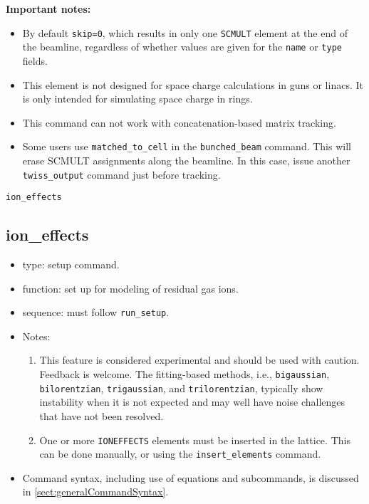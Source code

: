 \documentclass[11pt]{article}
\begin{document}
{\bf Important notes:}
\begin{itemize}
\item By default \verb|skip=0|, which results in only one \verb|SCMULT| element at the end of the beamline,
  regardless of whether values are given for the \verb|name| or \verb|type| fields.
\item This element is not designed for space charge calculations in guns or linacs.  It is only intended for
  simulating space charge in rings. 
\item This command can not work with concatenation-based matrix tracking.  
\item Some users use \verb|matched_to_cell| in the \verb|bunched_beam| command. 
  This will erase SCMULT assignments along the beamline. In this case, issue another \verb|twiss_output|
  command just before tracking.
\end{itemize}

\newpage
\begin{center}{\Large\verb|ion_effects|}\end{center}
\subsection{ion\_effects \label{subsec:ioneffects}}

\begin{itemize}
\item type: setup command.
\item function: set up for modeling of residual gas ions.
\item sequence: must follow \verb|run_setup|.
\item Notes:
  \begin{enumerate}
  \item This feature is considered experimental and should be used with caution.
    Feedback is welcome. The fitting-based methods, i.e., \verb|bigaussian|, \verb|bilorentzian|, 
    \verb|trigaussian|, and \verb|trilorentzian|, typically show instability when it is not expected and
    may well have noise challenges that have not been resolved.
  \item One or more \verb|IONEFFECTS| elements must be inserted in the lattice. This can be
    done manually, or using the \verb|insert_elements| command.
  \end{enumerate}
\item Command syntax, including use of equations and subcommands, is discussed in \ref{sect:generalCommandSyntax}.
\end{itemize}
\end{document}
